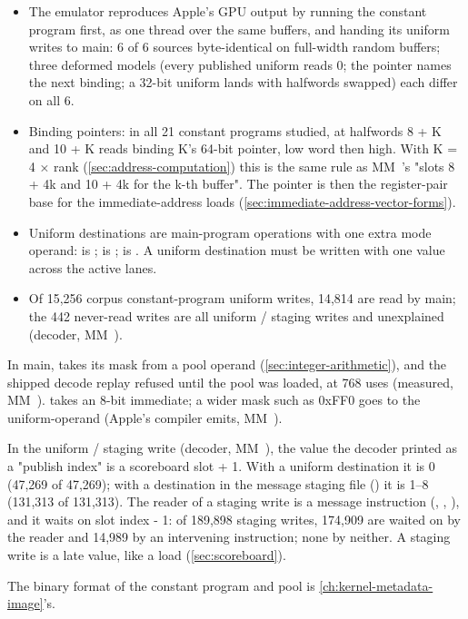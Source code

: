 \begin{itemize}
\item The emulator reproduces Apple's GPU output by running the constant program first, as one thread over the same buffers,
  and handing its uniform writes to main: 6 of 6 sources byte-identical on full-width random buffers; three deformed
  models (every published uniform reads 0; the pointer names the next binding; a 32-bit uniform lands with halfwords
  swapped) each differ on all 6.
\item Binding pointers: in all 21 constant programs studied,  at halfwords 8 + K
  and 10 + K reads binding K's 64-bit pointer, low word then high. With K = 4 × rank (\cref{sec:address-computation}) this is the same rule
  as MM~'s "slots 8 + 4k and 10 + 4k for the k-th buffer". The pointer is then the register-pair base for the
  immediate-address loads (\cref{sec:immediate-address-vector-forms}).
\item Uniform destinations are main-program operations with one extra mode operand:  is ;  is ;  is .
  A uniform destination must be written with one value across the active lanes.
\item Of 15,256 corpus constant-program uniform writes, 14,814 are read by main; the 442 never-read writes are all uniform /
  staging writes and unexplained (decoder, MM~).
\end{itemize}

In main,  takes its mask from a pool operand (\cref{sec:integer-arithmetic}), and the
shipped decode replay refused until the pool was loaded, at 768 uses (measured, MM~).  takes an 8-bit immediate; a wider mask such as 0xFF0 goes to the
uniform-operand  (Apple's compiler emits, MM~).

In the uniform / staging write (decoder, MM~), the value the decoder printed as a
"publish index" is a scoreboard slot + 1. With a uniform destination it is 0 (47,269 of 47,269); with a destination in the message staging file
() it is 1–8 (131,313 of 131,313). The reader of a staging write is a message instruction (, , ), and it waits on slot index - 1: of 189,898 staging writes,
174,909 are waited on by the reader and 14,989 by an intervening instruction; none by neither. A staging write is a
late value, like a load (\cref{sec:scoreboard}).

The binary format of the constant program and pool is \cref{ch:kernel-metadata-image}'s.

